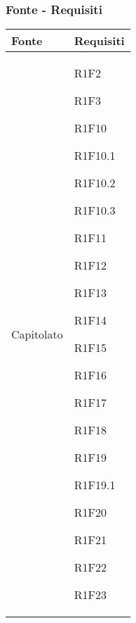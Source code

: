 \subsubsection{Fonte - Requisiti}
\begin{center}
	\begin{longtable}{|p{44mm}|p{22mm}|}
		\hline
		\rowcolor{lighter-grayer}
		\textbf{Fonte} &  \textbf{Requisiti}  \\
		\hline
		\endhead
		

Capitolato &

R1F2 \newline

R1F3 \newline

R1F10 \newline

R1F10.1 \newline

R1F10.2 \newline

R1F10.3 \newline

R1F11 \newline

R1F12 \newline

R1F13 \newline

R1F14 \newline

R1F15 \newline

R1F16 \newline

R1F17 \newline

R1F18 \newline

R1F19 \newline

R1F19.1 \newline

R1F20 \newline

R1F21 \newline

R1F22 \newline

R1F23 \newline


\end{longtable}
\end{center}
